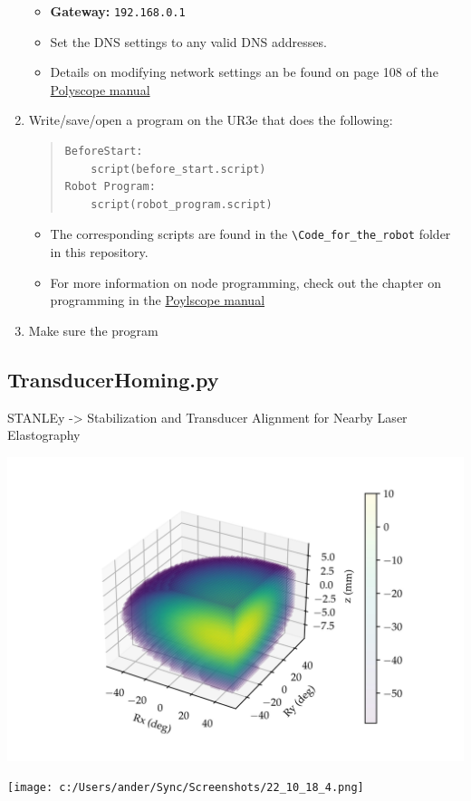 \documentclass[11pt]{article}
\begin{document}
\begin{enumerate}
\begin{itemize}
        \item \textbf{Gateway:} \texttt{192.168.0.1}
        \item Set the DNS settings to any valid DNS addresses.
        \item Details on modifying network settings an be found on page 108 of the \hyperlink{https://s3-eu-west-1.amazonaws.com/ur-support-site/44018/Software_Manual_en_Global.pdf\#page=108}{Polyscope manual}
    \end{itemize}
    \item Write/save/open a program on the UR3e that does the following:
        \begin{quote}
\begin{verbatim}
BeforeStart:
    script(before_start.script)
Robot Program:
    script(robot_program.script)        
\end{verbatim}
        \end{quote}
    \begin{itemize}
        \item The corresponding scripts are found in the \texttt{\textbackslash{}Code\_for\_the\_robot} folder in this repository.
        \item For more information on node programming, check out the chapter on programming in the \hyperlink{https://s3-eu-west-1.amazonaws.com/ur-support-site/44018/Software_Manual_en_Global.pdf\#page=60}{Poylscope manual} 
    \end{itemize}
    \item Make sure the program 
\end{enumerate}


\subsection{TransducerHoming.py}\label{sec:TransducerHoming}

STANLEy -> Stabilization and Transducer Alignment for Nearby Laser Elastography
\begin{center}
    \includegraphics[width=.9\linewidth]{../Debugging Scripts/figures/fullscan_render_test_4.jpg}
\end{center}

\begin{center}
    \texttt{[image: c:/Users/ander/Sync/Screenshots/22\_10\_18\_4.png]}
\end{center}
\end{document}
